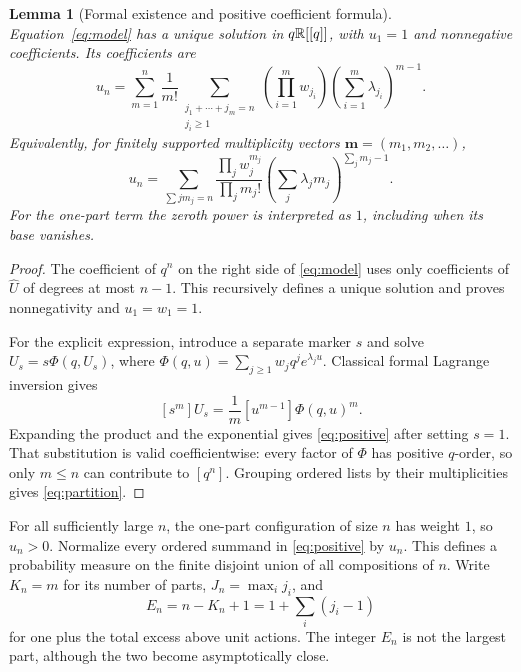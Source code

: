 \documentclass[11pt,a4paper]{article}
\numberwithin{equation}{section}
\newtheorem{lemma}[theorem]{Lemma}
\theoremstyle{definition}
\theoremstyle{remark}
\newcommand{\Uhat}{\widehat U}\newcommand{\Vhat}{\widehat V}
\begin{document}
\begin{lemma}[Formal existence and positive coefficient formula]
\label{lem:lagrange}
Equation~\eqref{eq:model} has a unique solution in $q\mathbb R[[q]]$, with
$u_1=1$ and nonnegative coefficients. Its coefficients are
\begin{equation}
 u_n=\sum_{m=1}^n\frac1{m!}
 \sum_{\substack{j_1+\cdots+j_m=n\\ j_i\ge1}}
 \left(\prod_{i=1}^m w_{j_i}\right)
 \left(\sum_{i=1}^m\lambda_{j_i}\right)^{m-1}.
 \label{eq:positive}
\end{equation}
Equivalently, for finitely supported multiplicity vectors
$\mathbf m=(m_1,m_2,\ldots)$,
\begin{equation}
 u_n=\sum_{\sum j m_j=n}
 \frac{\prod_j w_j^{m_j}}{\prod_jm_j!}
 \left(\sum_j\lambda_jm_j\right)^{\sum_jm_j-1}.
 \label{eq:partition}
\end{equation}
For the one-part term the zeroth power is interpreted as $1$, including
when its base vanishes.
\end{lemma}

\begin{proof}
The coefficient of $q^n$ on the right side of \eqref{eq:model} uses only
coefficients of $\Uhat$ of degrees at most $n-1$. This recursively defines
a unique solution and proves nonnegativity and $u_1=w_1=1$.

For the explicit expression, introduce a separate marker $s$ and solve
$U_s=s\Phi(q,U_s)$, where
$\Phi(q,u)=\sum_{j\ge1}w_jq^je^{\lambda_ju}$.
Classical formal Lagrange inversion gives
\[
 [s^m]U_s=\frac1m[u^{m-1}]\Phi(q,u)^m.
\]
Expanding the product and the exponential gives \eqref{eq:positive} after
setting $s=1$. That substitution is valid coefficientwise: every factor
of $\Phi$ has positive $q$-order, so only $m\le n$ can contribute to
$[q^n]$. Grouping ordered lists by their multiplicities gives
\eqref{eq:partition}.
\end{proof}

For all sufficiently large $n$, the one-part configuration of size $n$
has weight $1$, so $u_n>0$. Normalize every ordered summand in
\eqref{eq:positive} by $u_n$. This defines a probability measure on the
finite disjoint union of all compositions of $n$. Write $K_n=m$ for its
number of parts, $J_n=\max_i j_i$, and
\begin{equation}
 E_n=n-K_n+1=1+\sum_i(j_i-1)
 \label{eq:excess}
\end{equation}
for one plus the total excess above unit actions. The integer $E_n$ is
not the largest part, although the two become asymptotically close.
\end{document}
